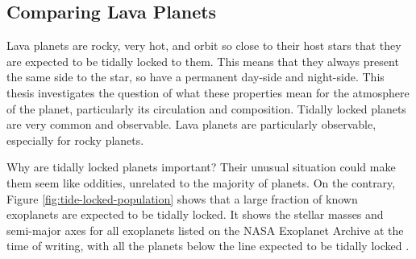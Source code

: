 \begin{SingleSpace}
\chapter{Comparing Lava Planets}
\vspace{0.5cm}
\end{SingleSpace}
\vspace{0.5cm}

Lava planets are rocky, very hot, and orbit so close to their host stars that they are expected to be tidally locked to them. This means that they always present the same side to the star, so have a permanent day-side and night-side. This thesis investigates the question of what these properties mean for the atmosphere of the planet, particularly its circulation and composition. Tidally locked planets are very common and observable. Lava planets are particularly observable, especially for rocky planets.

Why are tidally locked planets important? Their unusual situation could  make them seem like oddities, unrelated to the majority of planets. On the contrary, Figure \ref{fig:tide-locked-population} shows that a large fraction of known exoplanets are expected to be tidally locked. It shows the stellar masses and semi-major axes for all exoplanets listed on the NASA Exoplanet Archive at the time of writing, with all the planets below the line expected to be tidally locked \citep{pierrehumbert2018review}.

